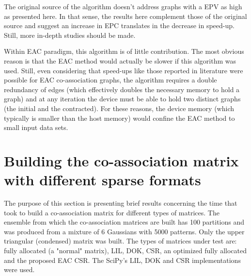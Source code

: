 The original source \cite{Sousa2015} of the algorithm doesn't address graphs with a EPV as high as presented here.
In that sense, the results here complement those of the original source and suggest an increase in EPC translates in the decrease in speed-up.
Still, more in-depth studies should be made.

Within EAC paradigm, this algorithm is of little contribution.
The most obvious reason is that the EAC method would actually be slower if this algorithm was used.
Still, even considering that speed-ups like those reported in literature were possible for EAC co-association graphs, the algorithm requires a double redundancy of edges (which effectively doubles the necessary memory to hold a graph) and at any iteration the device must be able to hold two distinct graphs (the initial and the contracted).
For these reasons, the device memory (which typically is smaller than the host memory) would confine the EAC method to small input data sets. 



\section{Building the co-association matrix with different sparse formats}
\label{sec:spare building}

The purpose of this section is presenting brief results concerning the time that took to build a co-association matrix for different types of matrices.
The ensemble from which the co-association matrices are built has 100 partitions and was produced from a mixture of 6 Gaussians with 5000 patterns.
Only the upper triangular (condensed) matrix was built.
The types of matrices under test are: fully allocated (a "normal" matrix), LIL, DOK, CSR, an optimized fully allocated and the proposed EAC CSR.
The SciPy's LIL, DOK and CSR implementations were used.

